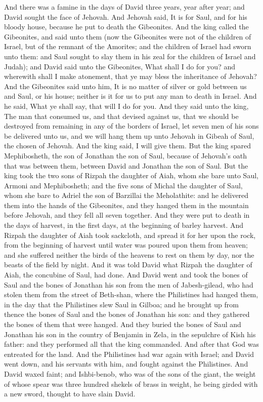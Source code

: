 And there was a famine in the days of David three years, year after year; and David sought the face of Jehovah. And Jehovah said, It is for Saul, and for his bloody house, because he put to death the Gibeonites. And the king called the Gibeonites, and said unto them (now the Gibeonites were not of the children of Israel, but of the remnant of the Amorites; and the children of Israel had sworn unto them: and Saul sought to slay them in his zeal for the children of Israel and Judah); and David said unto the Gibeonites, What shall I do for you? and wherewith shall I make atonement, that ye may bless the inheritance of Jehovah? And the Gibeonites said unto him, It is no matter of silver or gold between us and Saul, or his house; neither is it for us to put any man to death in Israel. And he said, What ye shall say, that will I do for you. And they said unto the king, The man that consumed us, and that devised against us, that we should be destroyed from remaining in any of the borders of Israel, let seven men of his sons be delivered unto us, and we will hang them up unto Jehovah in Gibeah of Saul, the chosen of Jehovah. And the king said, I will give them.  But the king spared Mephibosheth, the son of Jonathan the son of Saul, because of Jehovah’s oath that was between them, between David and Jonathan the son of Saul. But the king took the two sons of Rizpah the daughter of Aiah, whom she bare unto Saul, Armoni and Mephibosheth; and the five sons of Michal the daughter of Saul, whom she bare to Adriel the son of Barzillai the Meholathite: and he delivered them into the hands of the Gibeonites, and they hanged them in the mountain before Jehovah, and they fell all seven together. And they were put to death in the days of harvest, in the first days, at the beginning of barley harvest.  And Rizpah the daughter of Aiah took sackcloth, and spread it for her upon the rock, from the beginning of harvest until water was poured upon them from heaven; and she suffered neither the birds of the heavens to rest on them by day, nor the beasts of the field by night. And it was told David what Rizpah the daughter of Aiah, the concubine of Saul, had done.  And David went and took the bones of Saul and the bones of Jonathan his son from the men of Jabesh-gilead, who had stolen them from the street of Beth-shan, where the Philistines had hanged them, in the day that the Philistines slew Saul in Gilboa; and he brought up from thence the bones of Saul and the bones of Jonathan his son: and they gathered the bones of them that were hanged. And they buried the bones of Saul and Jonathan his son in the country of Benjamin in Zela, in the sepulchre of Kish his father: and they performed all that the king commanded. And after that God was entreated for the land.  And the Philistines had war again with Israel; and David went down, and his servants with him, and fought against the Philistines. And David waxed faint; and Ishbi-benob, who was of the sons of the giant, the weight of whose spear was three hundred shekels of brass in weight, he being girded with a new sword, thought to have slain David. 